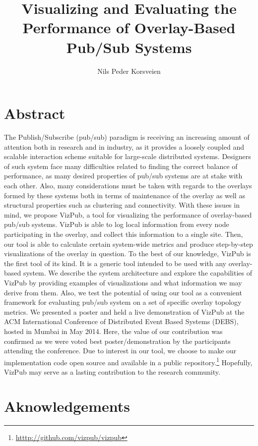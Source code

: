 \documentclass[UKenglish, a4paper]{ifimaster}
\title{Visualizing and Evaluating the Performance of Overlay-Based Pub/Sub Systems}
\subtitle{}
\author{Nils Peder Korsveien}
\newcommand{\demo}{{\sc VizPub}\xspace}
\begin{document}
\ififorside{}
\frontmatter{}
\maketitle{}

\chapter*{Abstract}

The Publish/Subscribe (pub/sub) paradigm is receiving an increasing
amount of attention both in research and in industry, as it provides a
loosely coupled and scalable interaction scheme suitable for large-scale
distributed systems. Designers of such system face many difficulties
related to finding the correct balance of performance, as many desired
properties of pub/sub systems are at stake with each other. Also, many
considerations must be taken with regards to the overlays formed by
these systems both in terms of maintenance of the overlay as well as
structural properties such as clustering and connectivity. With these
issues in mind, we propose \demo{}, a tool for visualizing the
performance of overlay-based pub/sub systems. \demo{} is able to log
local information from every node participating in the overlay, and
collect this information to a single site. Then, our tool is able to
calculate certain system-wide metrics and produce step-by-step
visualizations of the overlay in question. To the best of our knowledge,
\demo{} is the first tool of its kind. It is a generic tool intended to
be used with any overlay-based system. We describe the system
architecture and explore the capabilities of \demo{} by providing
examples of visualizations and what information we may derive from them.
Also, we test the potential of using our tool as a convenient framework
for evaluating pub/sub system on a set of specific overlay topology
metrics. We presented a poster and held a live demonstration of \demo{} at the
ACM International Conference of Distributed Event Based Systems (DEBS),
hosted in Mumbai in May 2014. Here, the value of our contribution was
confirmed as we were voted best poster/demonstration by the participants
attending the conference. Due to interest in our tool, we choose to make
our implementation code open source and available in a public
repository.\footnote{\url{htttp://github.com/vizpub/vizpub}} Hopefully,
\demo{} may serve as a lasting contribution to the research community.

\tableofcontents{}
\listoffigures{}
\listoftables{}
\chapter*{Aknowledgements}
\mainmatter{}
\end{document}
